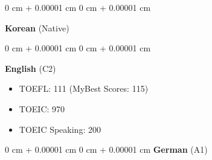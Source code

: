 \documentclass[10pt, letterpaper]{article}
\newenvironment{highlights}{
    \begin{itemize}[
        topsep=0.10 cm,
        parsep=0.10 cm,
        partopsep=0pt,
        itemsep=0pt,
        leftmargin=0 cm + 10pt
    ]
}{
    \end{itemize}
} %
\newenvironment{onecolentry}{
    \begin{adjustwidth}{
        0 cm + 0.00001 cm
    }{
        0 cm + 0.00001 cm
    }
}{
    \end{adjustwidth}
} %
\begin{document}
        \begin{onecolentry}
        \textbf{Korean} (Native)  
        \end{onecolentry}
         \vspace{0.03 cm}
        \begin{onecolentry}
        \textbf{English} (C2) \\
            \begin{highlights}
                \item TOEFL: 111 (MyBest Scores: 115)
                \item TOEIC: 970
                \item TOEIC Speaking: 200
            \end{highlights}
        \end{onecolentry}
         \vspace{0.03 cm}
        \begin{onecolentry}{}
        \textbf{German} (A1) \\
        \end{onecolentry}
\end{document}

